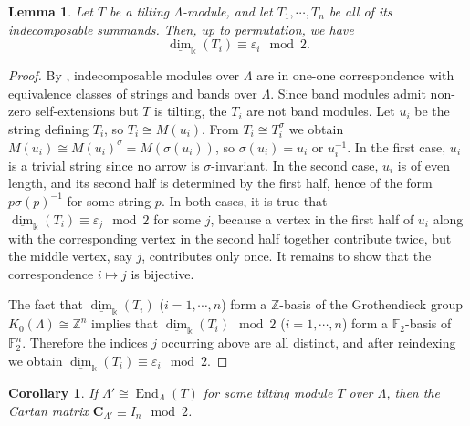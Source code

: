 \documentclass[11pt,reqno]{amsart}
\theoremstyle{plain}
\newtheorem{lemma}[theorem]{Lemma}
\newtheorem{corollary}[theorem]{Corollary}
\theoremstyle{definition}
\theoremstyle{remark}
\numberwithin{equation}{section}
\begin{document}
\begin{lemma}\label{lem:dim-vec of tilting modules form std basis}
    Let $T$ be a tilting $\Lambda$-module, and let $T_1,\cdots,T_n$ be all of its indecomposable summands. Then, up to permutation, we have
    \[\underline{\dim}_\Bbbk(T_i)\equiv\varepsilon_i\mod2.\]
\end{lemma}
\begin{proof}
    By \cite[Section 3]{BR}, indecomposable modules over $\Lambda$ are in one-one correspondence with equivalence classes of strings and bands over $\Lambda$. Since band modules admit non-zero self-extensions \cite[Page 165]{BR} but $T$ is tilting, the $T_i$ are not band modules. Let $u_i$ be the string defining $T_i$, so $T_i\cong M(u_i)$. From $T_i\cong T_i^\sigma$ we obtain $M(u_i)\cong M(u_i)^\sigma=M(\sigma(u_i))$, so $\sigma(u_i)=u_i$ or $u_i^{-1}$. In the first case, $u_i$ is a trivial string since no arrow is $\sigma$-invariant. In the second case, $u_i$ is of even length, and its second half is determined by the first half, hence of the form $p\sigma(p)^{-1}$ for some string $p$. In both cases, it is true that $\underline{\dim}_\Bbbk(T_i)\equiv\varepsilon_j\mod2$ for some $j$, because a vertex in the first half of $u_i$ along with the corresponding vertex in the second half together contribute twice, but the middle vertex, say $j$, contributes only once. It remains to show that the correspondence $i\mapsto j$ is bijective.
    \par The fact that $\underline{\dim}_\Bbbk(T_i)$ ($i=1,\cdots,n$) form a $\mathbb{Z}$-basis of the Grothendieck group $K_0(\Lambda)\cong\mathbb{Z}^n$ \cite[proof of Proposition 4.5]{ASS1} implies that $\underline{\dim}_\Bbbk(T_i)\mod2$ ($i=1,\cdots,n$) form a $\mathbb{F}_2$-basis of $\mathbb{F}_2^n$. Therefore the indices $j$ occurring above are all distinct, and after reindexing we obtain $\underline{\dim}_\Bbbk(T_i)\equiv\varepsilon_i\mod2$.
\end{proof}
\begin{corollary}\label{cor:Cartan matrix of tilting is I mod2}
    If $\Lambda'\cong\mathop{\mathrm{End}}_\Lambda(T)$ for some tilting module $T$ over $\Lambda$, then the Cartan matrix $\mathbf{C}_{\Lambda'}\equiv I_n\mod2$.
\end{corollary}
\end{document}
